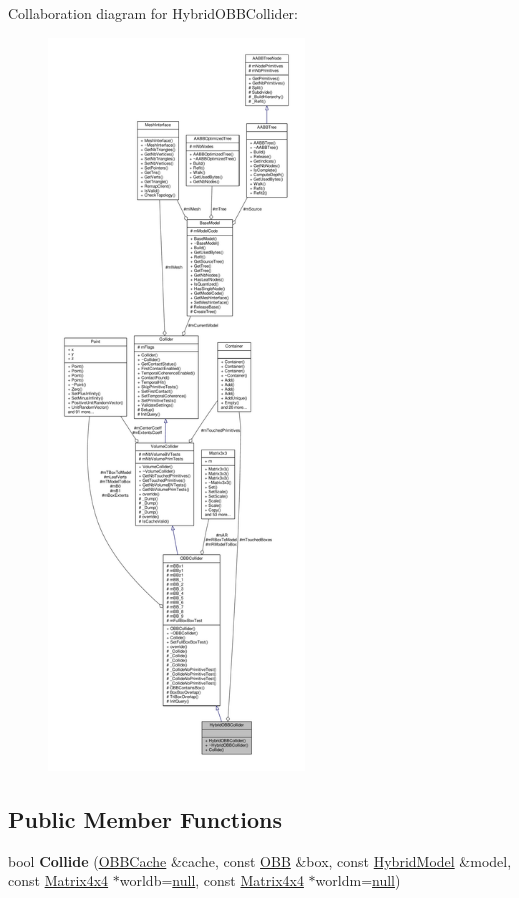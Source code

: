 Collaboration diagram for Hybrid\+O\+B\+B\+Collider\+:
\nopagebreak
\begin{figure}[H]
\begin{center}
\leavevmode
\includegraphics[height=550pt]{d9/d23/classHybridOBBCollider__coll__graph}
\end{center}
\end{figure}
\subsection*{Public Member Functions}
\begin{DoxyCompactItemize}
\item 
bool {\bfseries Collide} (\hyperlink{structOBBCache}{O\+B\+B\+Cache} \&cache, const \hyperlink{classOBB}{O\+BB} \&box, const \hyperlink{classHybridModel}{Hybrid\+Model} \&model, const \hyperlink{classMatrix4x4}{Matrix4x4} $\ast$worldb=\hyperlink{IceTypes_8h_ac97b8ee753e4405397a42ad5799b0f9e}{null}, const \hyperlink{classMatrix4x4}{Matrix4x4} $\ast$worldm=\hyperlink{IceTypes_8h_ac97b8ee753e4405397a42ad5799b0f9e}{null})\hypertarget{classHybridOBBCollider_a4f5c790cc308ace8db5c8d27f5c5805a}{}\label{classHybridOBBCollider_a4f5c790cc308ace8db5c8d27f5c5805a}

\end{DoxyCompactItemize}
